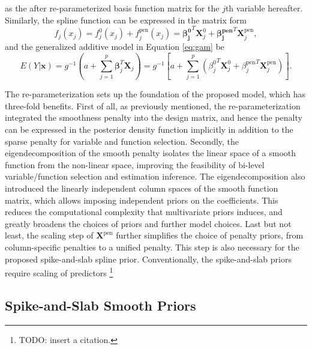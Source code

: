 \documentclass[AMA,STIX1COL,]{WileyNJD-v2}
\begin{document}
as the after re-parameterized basis function matrix for the \(j\)th
variable hereafter. Similarly, the spline function can be expressed in
the matrix form \[
f_j(x_j) = f_j^0(x_j) + f_j^\text{pen}(x_j) = \boldsymbol{\beta_j^0}^T \boldsymbol{X}_j^0 + \boldsymbol{\beta_j^\text{pen}}^T \boldsymbol{X}_j^\text{pen},
\] and the generalized additive model in Equation \ref{eq:gam} be
\begin{equation}\label{eq:gam-repa}
E(Y|\boldsymbol{x}) =  g^{-1}(a + \sum\limits^p_{j=1} \boldsymbol{\beta}_j^T \boldsymbol{X}_j) = g^{-1}\left[a + \sum\limits^p_{j=1} ({\beta_j^0}^T \boldsymbol{X}_j^0 + {\beta_j^\text{pen}}^T \boldsymbol{X}_j^\text{pen})\right].
\end{equation}

The re-parameterization sets up the foundation of the proposed model,
which has three-fold benefits. First of all, as previously mentioned,
the re-parameterization integrated the smoothness penalty into the
design matrix, and hence the penalty can be expressed in the posterior
density function implicitly in addition to the sparse penalty for
variable and function selection. Secondly, the eigendecomposition of the
smooth penalty isolates the linear space of a smooth function from the
non-linear space, improving the feasibility of bi-level
variable/function selection and estimation inference. The
eigendecomposition also introduced the linearly independent column
spaces of the smooth function matrix, which allows imposing independent
priors on the coefficients. This reduces the computational complexity
that multivariate priors induces, and greatly broadens the choices of
priors and further model choices. Last but not least, the scaling step
of \(\boldsymbol{X}^\text{pen}\) further simplifies the choice of
penalty priors, from column-specific penalties to a unified penalty.
This step is also necessary for the proposed spike-and-slab spline
prior. Conventionally, the spike-and-slab priors require scaling of
predictors \footnote{TODO: insert a citation.}

\hypertarget{spike-and-slab-smooth-priors}{%
\subsection{Spike-and-Slab Smooth
Priors}\label{spike-and-slab-smooth-priors}}
\end{document}
